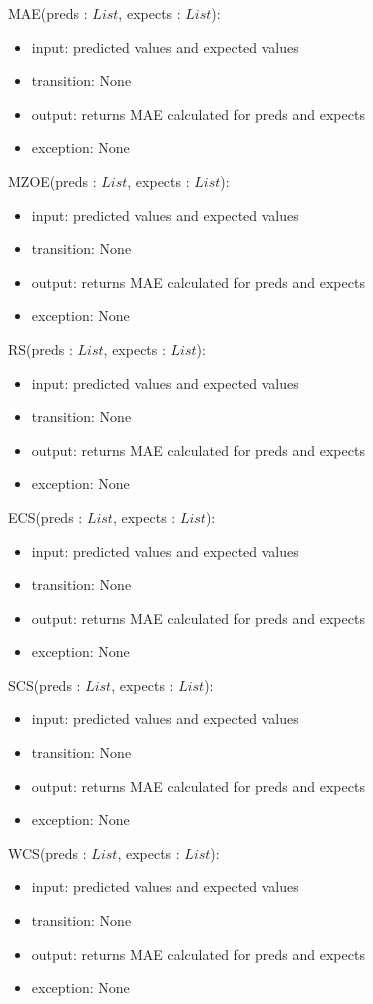 \documentclass[12pt, titlepage]{article}
\begin{document}
\noindent MAE(preds : $List$, expects : $List$):
\begin{itemize}
\item input: predicted values and expected values
\item transition: None
\item output: returns MAE calculated for preds and expects
\item exception: None
\end{itemize}

\noindent MZOE(preds : $List$, expects : $List$):
\begin{itemize}
\item input: predicted values and expected values
\item transition: None
\item output: returns MAE calculated for preds and expects
\item exception: None
\end{itemize}

\noindent RS(preds : $List$, expects : $List$):
\begin{itemize}
\item input: predicted values and expected values
\item transition: None
\item output: returns MAE calculated for preds and expects
\item exception: None
\end{itemize}

\noindent ECS(preds : $List$, expects : $List$):
\begin{itemize}
\item input: predicted values and expected values
\item transition: None
\item output: returns MAE calculated for preds and expects
\item exception: None
\end{itemize}

\noindent SCS(preds : $List$, expects : $List$):
\begin{itemize}
\item input: predicted values and expected values
\item transition: None
\item output: returns MAE calculated for preds and expects
\item exception: None
\end{itemize}

\noindent WCS(preds : $List$, expects : $List$):
\begin{itemize}
\item input: predicted values and expected values
\item transition: None
\item output: returns MAE calculated for preds and expects
\item exception: None
\end{itemize}
\end{document}

